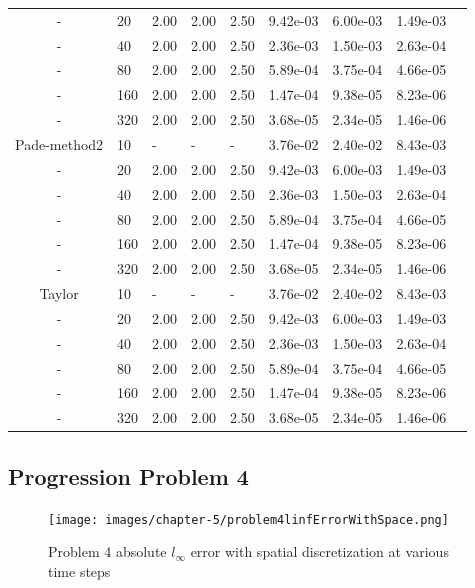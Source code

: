 \begin{table}[p]
{\begin{tabular}{cllllllll}
   - &   20 & 2.00 & 2.00 & 2.50 & 9.42e-03 & 6.00e-03 & 1.49e-03 \\  
   - &   40 & 2.00 & 2.00 & 2.50 & 2.36e-03 & 1.50e-03 & 2.63e-04 \\  
   - &   80 & 2.00 & 2.00 & 2.50 & 5.89e-04 & 3.75e-04 & 4.66e-05 \\  
   - &  160 & 2.00 & 2.00 & 2.50 & 1.47e-04 & 9.38e-05 & 8.23e-06 \\  
   - &  320 & 2.00 & 2.00 & 2.50 & 3.68e-05 & 2.34e-05 & 1.46e-06 \\  
   \hline
   Pade-method2 &   10 & - & - & - & 3.76e-02 & 2.40e-02 & 8.43e-03 \\  
   - &   20 & 2.00 & 2.00 & 2.50 & 9.42e-03 & 6.00e-03 & 1.49e-03 \\  
   - &   40 & 2.00 & 2.00 & 2.50 & 2.36e-03 & 1.50e-03 & 2.63e-04 \\  
   - &   80 & 2.00 & 2.00 & 2.50 & 5.89e-04 & 3.75e-04 & 4.66e-05 \\  
   - &  160 & 2.00 & 2.00 & 2.50 & 1.47e-04 & 9.38e-05 & 8.23e-06 \\  
   - &  320 & 2.00 & 2.00 & 2.50 & 3.68e-05 & 2.34e-05 & 1.46e-06 \\  
   \hline
   Taylor &   10 & - & - & - & 3.76e-02 & 2.40e-02 & 8.43e-03 \\  
   - &   20 & 2.00 & 2.00 & 2.50 & 9.42e-03 & 6.00e-03 & 1.49e-03 \\  
   - &   40 & 2.00 & 2.00 & 2.50 & 2.36e-03 & 1.50e-03 & 2.63e-04 \\  
   - &   80 & 2.00 & 2.00 & 2.50 & 5.89e-04 & 3.75e-04 & 4.66e-05 \\  
   - &  160 & 2.00 & 2.00 & 2.50 & 1.47e-04 & 9.38e-05 & 8.23e-06 \\  
   - &  320 & 2.00 & 2.00 & 2.50 & 3.68e-05 & 2.34e-05 & 1.46e-06 \\  
   \hline
   \end{tabular}
   }
\end{table}

\clearpage

\subsection{Progression Problem 4}
\begin{figure}[p]
    \centering
    \texttt{[image: images/chapter-5/problem4linfErrorWithSpace.png]}
    \caption{Problem 4 absolute $l_{\infty}$ error with spatial discretization at various time steps }
    \label{fig:problem4_linferror_spatial_results}
\end{figure}

